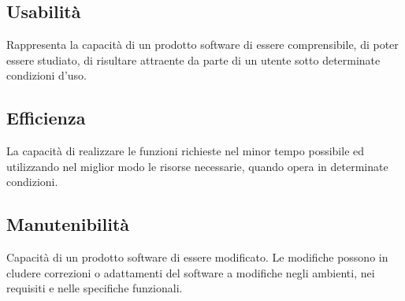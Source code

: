 \subsection{Usabilità}
Rappresenta la capacità di un prodotto software di essere comprensibile, di poter essere studiato, di risultare attraente da parte di un utente sotto determinate condizioni d'uso.
\def\productquality{
    {
        Qualità della messaggistica,
        $Q_{mex} = A_{clear}/B_{tot}$, 
        $Q_{mex} \geq 0.85$,
        $Q_{mex} = 1$
    },
    {
        Numero di click,
        $C_{click} = \#\ di\ click$,
        $C_{click} \leq 6$,
        $C_{click} \leq 4$,
        il task misurato è descritto nelle Norme di Progetto
    },
    {
        Site depth,
        $S_{depth} = td(G)$,
        $S_{depth} \leq 6$,
        $S_{depth} \leq 4$
    },
}


\subsection{Efficienza}
La capacità di realizzare le funzioni richieste nel minor tempo possibile ed utilizzando nel miglior modo le risorse necessarie, quando opera in determinate condizioni. 
\def\productquality{
    {
        Response time,
        $T_{response} = B_{end}-A_{start}$, 
        -,
        -,
        il task a cui fa riferimento la metrica è indicato nelle norme di progetto
    },
}




\subsection{Manutenibilità}
Capacità di un prodotto software di essere modificato. Le modifiche possono in cludere correzioni o adattamenti del software a modifiche negli ambienti, nei requisiti e nelle specifiche funzionali.
\def\productquality{
    {
        Complessità ciclomatica,
        $N_{err}/SLOC$, 
        -,
        -,
        è stato ritenuto prematuro definire valori sufficienti e ottimi per la metrica
    },
    {
        Autonomia dei test,
        qualcosa,
        qualsocsadd,
        0
    },
    {
        Facilità di comprensione,
        $A_{comm}/SLOC$,
        -,
        -,
        non sono stati forniti valori sufficienti e ottimi in quanto ritenuto prematuro
    },
    {
        Sfin,
        $sfin(u) =  \sum u_{caller}$,
        $sfin(u) \geq 2$,
        $sfin(u) \geq 4$
    },
    {
        Sfout, 
        $sfout(u) = \sum u_{callee}$,
        $sfout(u) \leq 0$,
        $sfout(u) = 0$
    },
}
